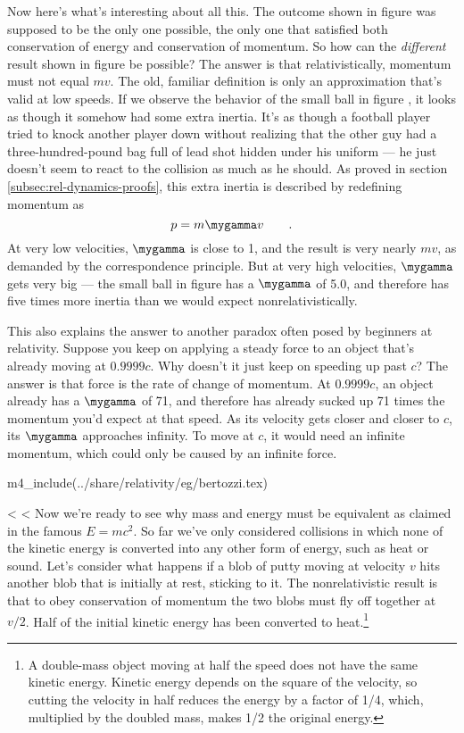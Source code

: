Now here's what's interesting about all this. The outcome shown in figure 
was supposed to be the only one possible, the only one that satisfied both conservation of energy
and conservation of momentum. So how can the \emph{different} result shown in figure
 be possible? The answer is that relativistically, momentum must not equal
$mv$. The old, familiar definition is only an approximation that's valid at low speeds. If
we observe the behavior of the small ball in figure , it looks as though it
somehow had some extra inertia. It's as though a football player tried to knock another player
down without realizing that the other guy had a three-hundred-pound bag full of lead shot
hidden under his uniform --- he just doesn't seem to react to the collision as much as he should.
As proved in section \ref{subsec:rel-dynamics-proofs},
this extra inertia is described by redefining momentum as
\begin{equation*}
        p = m \mygamma v \qquad .
\end{equation*}
At very low velocities, $\mygamma$ is close to 1, and the result is very nearly $mv$, as demanded
by the correspondence principle. But at very high velocities, $\mygamma$ gets very big --- the
small ball in figure  has a $\mygamma$ of 5.0, and therefore has five times
more inertia than we would expect nonrelativistically.

This also explains the answer to another paradox often posed by beginners at relativity.
Suppose you keep on applying a steady force to an object that's already moving at $0.9999c$.
Why doesn't it just keep on speeding up past $c$? The answer is that force is the rate of
change of momentum. At $0.9999c$, an object already has a $\mygamma$ of 71, and therefore
has already sucked up 71 times the momentum you'd expect at that speed. As its velocity gets closer and
closer to $c$, its $\mygamma$ approaches infinity. To move at $c$, it would need an infinite
momentum, which could only be caused by an infinite force.

m4_include(../share/relativity/eg/bertozzi.tex)

<%
<%
Now we're ready to see why mass and energy must be equivalent as claimed
in the famous $E=mc^2$. So far we've only considered collisions
in which none of the kinetic energy is converted into any other form
of energy, such as heat or sound.
Let's consider what happens if a blob of putty moving at
velocity $v$ hits another blob that is initially at rest,
sticking to it.  The nonrelativistic result is
that to obey conservation of momentum the two blobs must fly
off together at $v/2$. Half of the initial kinetic energy
has been converted to heat.\footnote{A double-mass object moving
at half the speed does not have the same kinetic energy. Kinetic
energy depends on the square of the velocity, so cutting the velocity
in half reduces the energy by a factor of 1/4, which, multiplied
by the doubled mass, makes 1/2 the original energy.}

